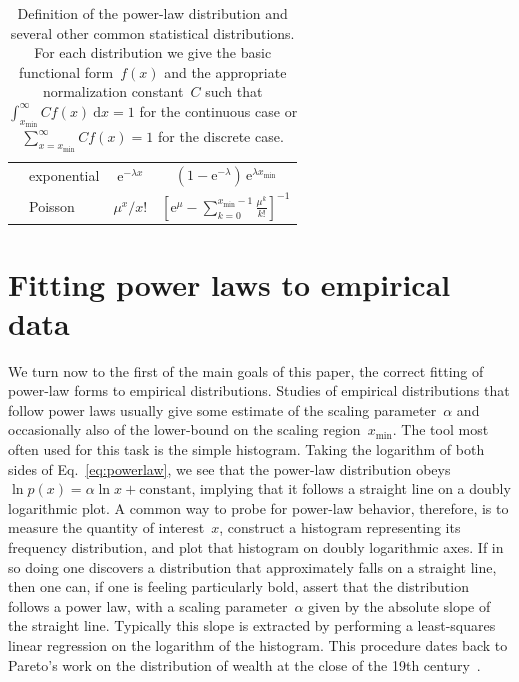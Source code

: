 \documentclass[final]{siamltex}
\newcommand{\e}{\mathrm{e}}
\renewcommand{\d}{\mathrm{d}}
\newcommand{\xmin}{\ensuremath{x_{\min}}}
\begin{document}
\begin{table}
\begin{center}
\begin{tabular}{l|l|cc}
 & \multirow{2}{5em}{exponential}
 & \multirow{2}{*}{$\e^{-\lambda x}$}
 & \multirow{2}{*}{$(1-\e^{-\lambda})\,\e^{\lambda \xmin}$} \\
& & & \\

 & \multirow{2}{5em}{Poisson}
 & \multirow{2}{*}{$\mu^x/x!$}
 & \multirow{2}{*}{${\left[\e^{\mu} - \sum_{k=0}^{\xmin-1}{\frac{\mu^k}{k!}}\right]}^{-1}$} \\
& & & \\
\end{tabular}
\end{center}
\caption{Definition of the power-law distribution and several other common
 statistical distributions.  For each distribution we give the
 basic functional form~$f(x)$ and the appropriate normalization
 constant~$C$ such that $\int_{\xmin}^\infty Cf(x)\>\d x=1$ for the
 continuous case or $\sum_{x=\xmin}^\infty Cf(x) = 1$ for the discrete
 case.}
\label{table:distributions}
\end{table}

\section{Fitting power laws to empirical data}
\label{sec:fitting}
We turn now to the first of the main goals of this paper, the correct fitting
of power-law forms to empirical distributions.  Studies of empirical
distributions that follow power laws usually give some estimate of the scaling
parameter~$\alpha$ and occasionally also of the lower-bound on the scaling
region~$\xmin$.  The tool most often used for this task is the simple
histogram.  Taking the logarithm of both sides of Eq.~\eqref{eq:powerlaw}, we
see that the power-law distribution obeys $\ln p(x) = \alpha \ln x +
\mbox{constant}$, implying that it follows a straight line on a doubly
logarithmic plot.  A common way to probe for power-law behavior, therefore, is
to measure the quantity of interest~$x$, construct a histogram representing its
frequency distribution, and plot that histogram on doubly logarithmic axes. If
in so doing one discovers a distribution that approximately falls on a straight
line, then one can, if one is feeling particularly bold, assert that the
distribution follows a power law, with a scaling parameter~$\alpha$ given by
the absolute slope of the straight line.  Typically this slope is extracted by
performing a least-squares linear regression on the logarithm of the histogram.
This procedure dates back to Pareto's work on the distribution of wealth at the
close of the 19th century~\cite{Arnold-on-Pareto-distributions}.
\end{document}
